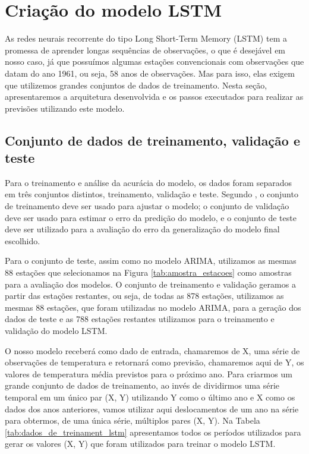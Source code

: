 \section{Criação do modelo LSTM}

As redes neurais recorrente do tipo Long Short-Term Memory (LSTM) tem a promessa de aprender longas sequências de observações, o que é desejável em nosso caso, já que possuímos algumas estações convencionais com observações que datam do ano 1961, ou seja, 58 anos de observações.  Mas para isso, elas exigem que utilizemos grandes conjuntos de dados de treinamento. Nesta seção,  apresentaremos a arquitetura desenvolvida e os passos executados para realizar as previsões utilizando este modelo. 

\subsection{Conjunto de dados de treinamento, validação e teste}

Para o treinamento e análise da acurácia do modelo, os dados foram separados em três conjuntos distintos, treinamento, validação e teste. Segundo , o conjunto de treinamento deve ser usado para ajustar o modelo; o conjunto de validação deve ser usado para estimar o erro da predição do modelo, e o conjunto de teste deve ser utilizado para a avaliação do erro da generalização do modelo final escolhido. 

Para o conjunto de teste, assim como no modelo ARIMA, utilizamos as mesmas 88 estações que selecionamos na Figura \ref{tab:amostra_estacoes} como amostras para a avaliação dos modelos. O conjunto de treinamento e validação geramos a partir das estações restantes, ou seja, de todas as 878 estações, utilizamos as mesmas 88 estações, que foram utilizadas no modelo ARIMA,  para a geração dos dados de teste e as 788 estações restantes utilizamos para o treinamento e validação do modelo LSTM.

O nosso modelo receberá como dado de entrada, chamaremos de X, uma série de observações de temperatura e retornará como previsão, chamaremos aqui de Y, os valores de temperatura média previstos para o próximo ano. Para criarmos um grande conjunto de dados de treinamento, ao invés de dividirmos uma série temporal em um único par (X, Y) utilizando Y como o último ano e X como os dados dos anos anteriores, vamos utilizar aqui deslocamentos de um ano na série para obtermos, de uma única série, múltiplos pares (X, Y). Na Tabela \ref{tab:dados_de_treinament_lstm} apresentamos todos os períodos utilizados para gerar os valores (X, Y) que foram utilizados para treinar o modelo LSTM. 

